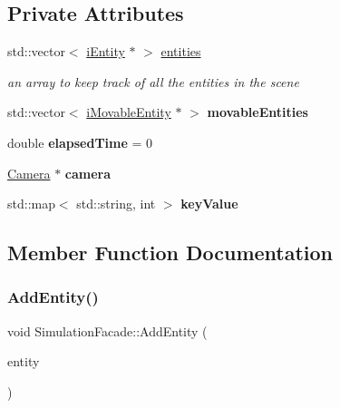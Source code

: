 \subsection*{Private Attributes}
\begin{DoxyCompactItemize}
\item 
\mbox{\label{classSimulationFacade_aa6e2a84334ca9df9fa0c082b6f034217}} 
std\+::vector$<$ \hyperlink{classiEntity}{i\+Entity} $\ast$ $>$ \hyperlink{classSimulationFacade_aa6e2a84334ca9df9fa0c082b6f034217}{entities}
\begin{DoxyCompactList}\small\item\em an array to keep track of all the entities in the scene \end{DoxyCompactList}\item 
\mbox{\label{classSimulationFacade_a3939c46e992e2e0f405c2cfdc171de9e}} 
std\+::vector$<$ \hyperlink{classiMovableEntity}{i\+Movable\+Entity} $\ast$ $>$ {\bfseries movable\+Entities}
\item 
\mbox{\label{classSimulationFacade_a8e9b28e695ea8a69631f5c5544832761}} 
double {\bfseries elapsed\+Time} = 0
\item 
\mbox{\label{classSimulationFacade_a7dad85786b3fbc6f2d9084ae3b7cf87e}} 
\hyperlink{classCamera}{Camera} $\ast$ {\bfseries camera}
\item 
\mbox{\label{classSimulationFacade_af18ba40080d8371eb5544ffa7fd70388}} 
std\+::map$<$ std\+::string, int $>$ {\bfseries key\+Value}
\end{DoxyCompactItemize}


\subsection{Member Function Documentation}
\mbox{\label{classSimulationFacade_a7647c750c98ea6c40d82e66bb3ee13d6}} 
\subsubsection{\texorpdfstring{Add\+Entity()}{AddEntity()}}
{\footnotesize\ttfamily void Simulation\+Facade\+::\+Add\+Entity (\begin{DoxyParamCaption}\item[{\hyperlink{classiEntity}{i\+Entity} $\ast$}]{entity }\end{DoxyParamCaption})}



